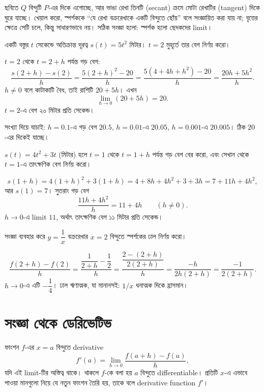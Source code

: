 \documentclass[11pt]{article}
\begin{document}
ছবিতে $Q$ বিন্দুটি $P$-এর দিকে এগোচ্ছে, আর ভাঙা রেখা তিনটি (secant) ক্রমে মোটা
রেখাটির (tangent) দিকে ঘুরে যাচ্ছে। খেয়াল করো, স্পর্শককে ``যে রেখা বক্ররেখাকে
একটি বিন্দুতে ছোঁয়'' বলে সংজ্ঞায়িত করা যায় না; বৃত্তের ক্ষেত্রে সেটি চলে,
কিন্তু সাধারণভাবে নয়। সঠিক সংজ্ঞা হলো: স্পর্শক হলো ছেদকদের limit।

\begin{example}
একটি বস্তুর $t$ সেকেন্ডে অতিক্রান্ত দূরত্ব $s(t) = 5t^{2}$ মিটার। $t = 2$
মুহূর্তে তার বেগ নির্ণয় করো।
\end{example}

\begin{solbox}
$t = 2$ থেকে $t = 2+h$ পর্যন্ত গড় বেগ:
\[
  \frac{s(2+h) - s(2)}{h}
  = \frac{5(2+h)^{2} - 20}{h}
  = \frac{5\left( 4 + 4h + h^{2} \right) - 20}{h}
  = \frac{20h + 5h^{2}}{h} .
\]
$h \neq 0$ বলে কাটাকাটি বৈধ, তাই রাশিটি $20 + 5h$। এখন
\[
  \lim_{h \to 0} (20 + 5h) = 20 .
\]
$t = 2$-এ বেগ ২০ মিটার প্রতি সেকেন্ড।

সংখ্যা দিয়ে যাচাই: $h = 0.1$-এ গড় বেগ $20.5$, $h = 0.01$-এ $20.05$,
$h = 0.001$-এ $20.005$। ঠিক $20$-এর দিকেই যাচ্ছে।
\end{solbox}

 $s(t) = 4t^{2} + 3t$ (মিটার) হলে $t = 1$ থেকে $t = 1+h$ পর্যন্ত গড়
বেগ বের করো, এবং সেখান থেকে $t = 1$-এ তাৎক্ষণিক বেগ নির্ণয় করো।

\begin{sol}
\[
  s(1+h) = 4(1+h)^{2} + 3(1+h) = 4 + 8h + 4h^{2} + 3 + 3h = 7 + 11h + 4h^{2} ,
\]
আর $s(1) = 7$। সুতরাং গড় বেগ
\[
  \frac{11h + 4h^{2}}{h} = 11 + 4h \qquad (h \neq 0) .
\]
$h \to 0$-এ limit $11$, অর্থাৎ তাৎক্ষণিক বেগ ১১ মিটার প্রতি সেকেন্ড।
\end{sol}

 সংজ্ঞা ব্যবহার করে $y = \dfrac{1}{x}$ বক্ররেখার $x = 2$ বিন্দুতে
স্পর্শকের ঢাল নির্ণয় করো।

\begin{sol}
\[
  \frac{f(2+h)-f(2)}{h}
  = \frac{\dfrac{1}{2+h} - \dfrac{1}{2}}{h}
  = \frac{\dfrac{2 - (2+h)}{2(2+h)}}{h}
  = \frac{-h}{2h(2+h)} = \frac{-1}{2(2+h)} .
\]
$h \to 0$-এ এটি $-\dfrac{1}{4}$। ঢাল ঋণাত্মক, যা মানানসই: $1/x$ ধনাত্মক
দিকে হ্রাসমান।
\end{sol}

\section{সংজ্ঞা থেকে ডেরিভেটিভ}

\begin{idea}[Derivative]
ফাংশন $f$-এর $x = a$ বিন্দুতে derivative
\[
  f'(a) = \lim_{h \to 0} \frac{f(a+h) - f(a)}{h} ,
\]
যদি এই limit-টির অস্তিত্ব থাকে। থাকলে $f$-কে বলা হয় $a$ বিন্দুতে
differentiable। প্রতিটি $x$-এ এভাবে পাওয়া মানগুলো নিয়ে যে নতুন ফাংশন তৈরি হয়,
তাকে বলে derivative function $f'$।
\end{idea}
\end{document}
